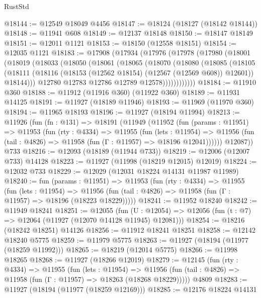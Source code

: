 \begin{lexlean}{RustStd}
\begin{coremodule}
@18144 := @12549 @18049 @4456
@18147 := @18124 (@18127 (@18142 @18144))
@18148 := @11941 @608
@18149 := @12137 @18148
@18150 := @18147 @18149
@18151 := @12011 @1121
@18153 := @18150 (@12558 @18151)
@18154 := @12035 @1121
@18183 := @17908
    (@17934
      (@17976
        (@17978
          (@17980
            (@18001
              (@18019
                (@18033
                  (@18050
                    (@18061
                      (@18065
                        (@18070
                          (@18080
                            (@18085
                              (@18105
                                (@18111
                                  (@18116 (@18153 (@12562 @18154) (@12567 (@12569 @608)) @12601))
                                  @18144)))
                            @12780
                            @12783
                            @12786
                            @12789
                            @12578))))))))))))
@18184 := @11910 @360
@18188 := @11912 (@11916 @360) (@11922 @360)
@18189 := @11931 @14125
@18191 := @11927 (@18189 @11946)
@18193 := @11969 (@11970 @360)
@18194 := @11965 @18193
@18196 := @11927 (@18194 @11994)
@18213 := @11926
    (fun (fn : @131) =>
    @18191
      (@11949
        (@11952
          (fun (params : @11951) =>
          @11953
            (fun (rty : @4334) =>
            @11955
              (fun (lets : @11954) =>
              @11956 (fun (tail : @4826) => @11958 (fun (Γ : @11957) => @18196 @12041))))))
        @12087))
    @733
@18216 := @12093 (@18189 (@11944 @733))
@18219 := @12006 (@12007 @733) @14128
@18223 := @11927 (@11998 (@18219 @12015) @12019)
@18224 := @12032 @733
@18229 := @12029 (@12031 @18224 @14131 @11987 @11989)
@18240 := fun (params : @11951) =>
  @11953
    (fun (rty : @4334) =>
    @11955
      (fun (lets : @11954) =>
      @11956 (fun (tail : @4826) => @11958 (fun (Γ : @11957) => @18196 (@18223 @18229)))))
@18241 := @11952 @18240
@18242 := @11949 @18241
@18251 := @12055
    (fun (U : @12054) => @12056 (fun (t : @7) => @12064 (@11927 (@12070 @14128 @11945) @12081)))
@18254 := @18216 (@18242 @18251) @14126
@18256 := @11912 @18241 @18251
@18258 := @12142 @18240 @5775
@18259 := @11979 @5775
@18263 := @11927 (@18194 (@11977 (@18259 @11992)))
@18265 := @18219 (@12014 @5775)
@18266 := @11998 @18265
@18268 := @11927 (@18266 @12019)
@18279 := @12145
    (fun (rty : @4334) =>
    @11955
      (fun (lets : @11954) =>
      @11956 (fun (tail : @4826) => @11958 (fun (Γ : @11957) => @18263 (@18268 @18229)))))
    @4809
@18283 := @11927 (@18194 (@11977 (@18259 @12169)))
@18285 := @12176 @18224 @14131

\end{coremodule}
\end{lexlean}
